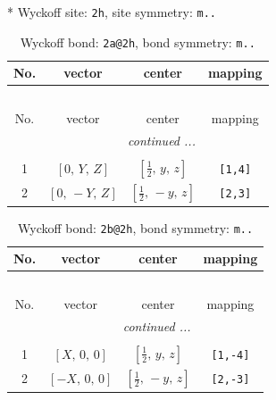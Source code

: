 \documentclass[fleqn,8pt]{jsarticle}
\begin{document}
* Wyckoff site: {\tt 2h}, site symmetry: {\tt m..}
\renewcommand{\arraystretch}{1.2}
\begin{longtable}{cccc}
\caption{Wyckoff bond: {\tt 2a@2h}, bond symmetry: {\tt m..}}
 \\
 \hline \hline
No. & vector & center & mapping \\ \hline \endfirsthead

\multicolumn{3}{l}{\tablename\ \thetable{}} \\
 \hline \hline
No. & vector & center & mapping \\ \hline \endhead

 \hline \hline
\multicolumn{3}{r}{\footnotesize\it continued ...} \\ \endfoot

 \hline \hline
\multicolumn{3}{r}{} \\ \endlastfoot

1 & $\left[ 0,\, Y,\, Z \right]$ & $\left[ \frac{1}{2},\, y,\, z \right]$ & {\tt [1,4]} \\ \hline
2 & $\left[ 0,\, - Y,\, Z \right]$ & $\left[ \frac{1}{2},\, - y,\, z \right]$ & {\tt [2,3]} \\
\end{longtable}
\renewcommand{\arraystretch}{1.2}
\begin{longtable}{cccc}
\caption{Wyckoff bond: {\tt 2b@2h}, bond symmetry: {\tt m..}}
 \\
 \hline \hline
No. & vector & center & mapping \\ \hline \endfirsthead

\multicolumn{3}{l}{\tablename\ \thetable{}} \\
 \hline \hline
No. & vector & center & mapping \\ \hline \endhead

 \hline \hline
\multicolumn{3}{r}{\footnotesize\it continued ...} \\ \endfoot

 \hline \hline
\multicolumn{3}{r}{} \\ \endlastfoot

1 & $\left[ X,\, 0,\, 0 \right]$ & $\left[ \frac{1}{2},\, y,\, z \right]$ & {\tt [1,-4]} \\ \hline
2 & $\left[ - X,\, 0,\, 0 \right]$ & $\left[ \frac{1}{2},\, - y,\, z \right]$ & {\tt [2,-3]} \\
\end{longtable}
\renewcommand{\arraystretch}{1.2}
\end{document}
